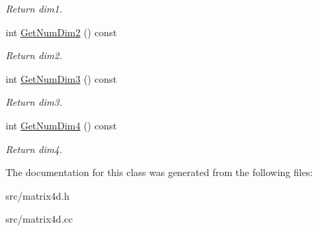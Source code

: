 \begin{DoxyCompactItemize}
\begin{DoxyCompactList}\small\item\em Return dim1. \item\end{DoxyCompactList}\item 
\hypertarget{classMatrix4D_a911bf63762bff343b18402a6c1dd9345}{
int \hyperlink{classMatrix4D_a911bf63762bff343b18402a6c1dd9345}{GetNumDim2} () const }
\label{d7/d9c/classMatrix4D_a911bf63762bff343b18402a6c1dd9345}

\begin{DoxyCompactList}\small\item\em Return dim2. \item\end{DoxyCompactList}\item 
\hypertarget{classMatrix4D_a65fcee9bc1c4eff1210799cf5d72bbe2}{
int \hyperlink{classMatrix4D_a65fcee9bc1c4eff1210799cf5d72bbe2}{GetNumDim3} () const }
\label{d7/d9c/classMatrix4D_a65fcee9bc1c4eff1210799cf5d72bbe2}

\begin{DoxyCompactList}\small\item\em Return dim3. \item\end{DoxyCompactList}\item 
\hypertarget{classMatrix4D_abf9f0c77981cd832b6baaf2c934d92ef}{
int \hyperlink{classMatrix4D_abf9f0c77981cd832b6baaf2c934d92ef}{GetNumDim4} () const }
\label{d7/d9c/classMatrix4D_abf9f0c77981cd832b6baaf2c934d92ef}

\begin{DoxyCompactList}\small\item\em Return dim4. \item\end{DoxyCompactList}\end{DoxyCompactItemize}


The documentation for this class was generated from the following files:\begin{DoxyCompactItemize}
\item 
src/matrix4d.h\item 
src/matrix4d.cc\end{DoxyCompactItemize}
